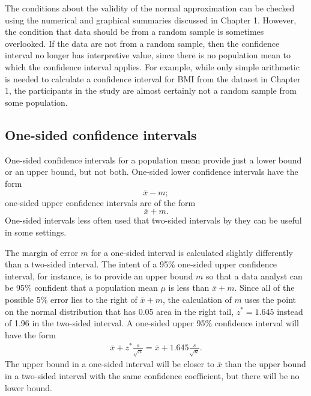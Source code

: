 \begin{spacing}{1.5}
The conditions about the validity of the normal approximation can be checked using the numerical and graphical summaries discussed in Chapter 1. However, the condition that data should be from a random sample is sometimes overlooked. If the data are not from a random sample, then the confidence interval no longer has interpretive value, since there is no population mean to which the confidence interval applies. For example, while only simple arithmetic is needed to calculate a confidence interval for BMI from the  dataset in Chapter 1, the participants in the study are almost certainly not a random sample from some population. 



\subsection{One-sided confidence intervals}
\label{onesidedCIs}

One-sided confidence intervals for a population mean provide just a lower bound or an upper bound, but not both.  One-sided lower confidence intervals have the form
\[
    \overline{x} - m;
\]
one-sided upper confidence intervals are of the form 
\[
    \overline{x} + m.
\]
One-sided intervals less often used that two-sided intervals by they can be useful in some settings.

The margin of error $m$ for a one-sided interval is calculated slightly differently than a two-sided interval.  The intent of a 95\% one-sided upper confidence interval, for instance, is to provide an upper bound $m$ so that a data analyst can be 95\% confident that a population mean $\mu$ is less than $\overline{x} + m$.  Since all of the possible 5\% error lies to the right of $\overline{x} + m$, the calculation of $m$ uses the point on the normal distribution that has 0.05 area in the right tail, $z^{*} = 1.645$ instead of 1.96 in the two-sided interval.  A one-sided upper 95\%  confidence interval will have the form
\begin{align*}
	\overline{x} + z^{*} \frac{s}{\sqrt{n}} = \overline{x} + 1.645 \frac{s}{\sqrt{n}}.
\end{align*}
The upper bound in a one-sided interval will be closer to $\overline{x}$ than the upper bound in a two-sided interval with the same confidence coefficient, but there  will be no lower bound.  


\end{spacing}
